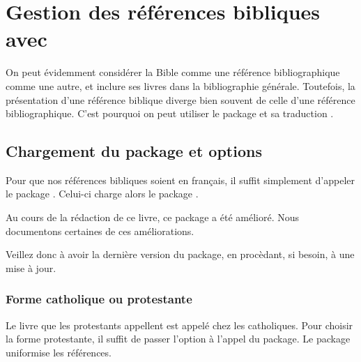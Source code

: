 \chapter{Gestion des références bibliques avec }

\begin{prealable}

On peut évidemment considérer la Bible comme une référence bibliographique comme une autre, et inclure ses livres dans la bibliographie générale.
Toutefois, la présentation d'une référence biblique diverge bien souvent de celle d'une référence bibliographique.
C'est pourquoi on peut utiliser le package  et sa traduction .
\end{prealable}


\section{Chargement du package et options}

Pour que nos références bibliques soient en français, il suffit simplement d'appeler le package . Celui-ci charge alors le package .


\begin{latexcode}
\usepackage{bibleref-french}
\end{latexcode}

\begin{attention}
Au cours de la rédaction de ce livre, ce package a été amélioré. Nous documentons certaines de ces améliorations. 

Veillez donc à avoir la dernière version du package, en procèdant, si besoin, à une mise à jour.

\end{attention}

\subsection{Forme catholique ou protestante}
Le livre que les protestants appellent  est appelé  chez les catholiques. Pour choisir la forme protestante, il suffit de passer l'option  à l'appel du package. Le package uniformise les références.

\begin{latexcode}
\usepackage[protestant]{bibleref}
\end{latexcode}

